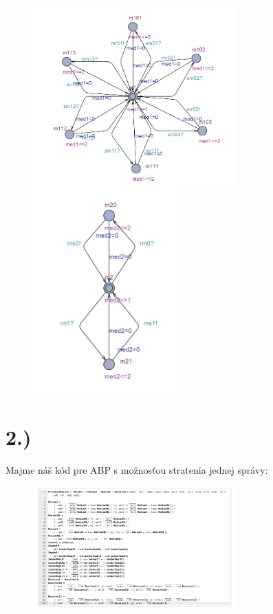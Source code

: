 \documentclass[a4paper]{article}
\begin{document}
\begin{figure}[!h]
	\centering
	\includegraphics[width=0.7\textwidth]{m1.png}
	\includegraphics[width=0.5\textwidth]{m2.png}
\end{figure}
\newpage

\section{2.)}

Majme náš kód pre ABP s možnosťou stratenia jednej správy:

\begin{figure}[!h]
	\centering
	\includegraphics[width=0.7\textwidth]{ABP.png}
\end{figure}
\end{document}
